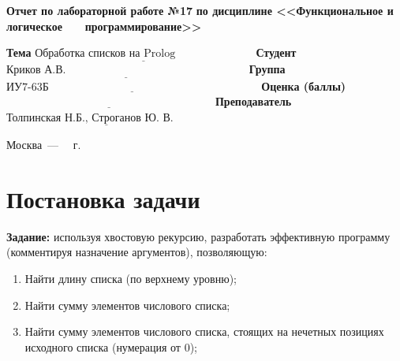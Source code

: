 \documentclass[12pt]{report}
\begin{document}
\begin{titlepage}
		\begin{center}
			\noindent\begin{minipage}{1.1\textwidth}\centering
				\Large\textbf{  Отчет по лабораторной работе №17}\newline
				\textbf{по дисциплине <<Функциональное и логическое}\newline
				\textbf{~~~программирование>>}\newline\newline
			\end{minipage}
		\end{center}
		
		\noindent\textbf{Тема} $\underline{\text{Обработка списков на Prolog~~~~~~~~~~~~~~~~~~~~~}}$\newline\newline
		\noindent\textbf{Студент} $\underline{\text{Криков А.В.~~~~~~~~~~~~~~~~~~~~~~~~~~~~~~~~~~~~~~~~~~~~~~~~~}}$\newline\newline
		\noindent\textbf{Группа} $\underline{\text{ИУ7-63Б~~~~~~~~~~~~~~~~~~~~~~~~~~~~~~~~~~~~~~~~~~~~~~~~~~~~~~~~~}}$\newline\newline
		\noindent\textbf{Оценка (баллы)} $\underline{\text{~~~~~~~~~~~~~~~~~~~~~~~~~~~~~~~~~~~~~~~~~~~~~~~~~~~~~~~~}}$\newline\newline
		\noindent\textbf{Преподаватель} $\underline{\text{Толпинская Н.Б., Строганов Ю. В.~~~~~~~~~}}$\newline\newline\newline
		
		\begin{center}
			\vfill
			Москва~---~\the\year
			~г.
		\end{center}
	\end{titlepage}
	


\section*{Постановка задачи}

\textbf{Задание:} используя хвостовую рекурсию, разработать эффективную программу (комментируя назначение аргументов), позволяющую:
\begin{enumerate}
	\item Найти длину списка (по верхнему уровню);
	\item Найти сумму элементов числового списка;
	\item Найти сумму элементов числового списка, стоящих на нечетных позициях исходного списка (нумерация от 0);
\end{enumerate}
\end{document}
